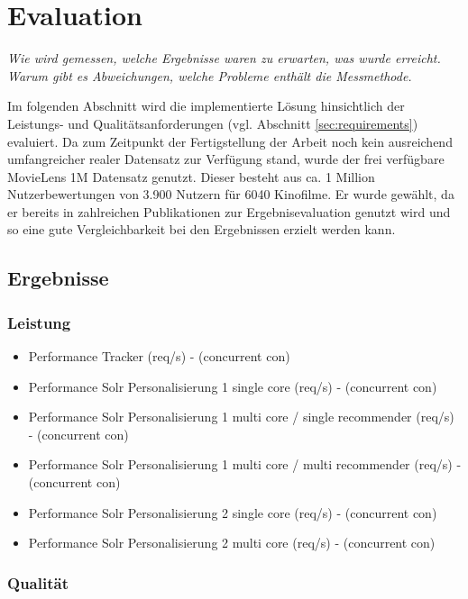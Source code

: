 \section{Evaluation}\label{sec:evaluation}

\textit{Wie wird gemessen, welche Ergebnisse waren zu erwarten, was wurde erreicht. Warum gibt es Abweichungen, welche Probleme enthält die Messmethode.}

Im folgenden Abschnitt wird die implementierte Lösung hinsichtlich der Leistungs- und Qualitätsanforderungen (vgl. Abschnitt \ref{sec:requirements}) evaluiert. Da zum Zeitpunkt der Fertigstellung der Arbeit noch kein ausreichend umfangreicher realer Datensatz zur Verfügung stand, wurde der frei verfügbare MovieLens 1M \citep{movielens1m} Datensatz genutzt. Dieser besteht aus ca. 1 Million Nutzerbewertungen von 3.900 Nutzern für 6040 Kinofilme. Er wurde gewählt, da er bereits in zahlreichen Publikationen zur Ergebnisevaluation genutzt wird und so eine gute Vergleichbarkeit bei den Ergebnissen erzielt werden kann.

\subsection{Ergebnisse}

\subsubsection{Leistung}

\begin{itemize}
\item Performance Tracker (req/s) - (concurrent con)
\item Performance Solr Personalisierung 1 single core (req/s) - (concurrent con)
\item Performance Solr Personalisierung 1 multi core / single recommender (req/s) - (concurrent con)
\item Performance Solr Personalisierung 1 multi core / multi recommender (req/s) - (concurrent con)
\item Performance Solr Personalisierung 2 single core (req/s) - (concurrent con)
\item Performance Solr Personalisierung 2 multi core (req/s) - (concurrent con)
\end{itemize}

\subsubsection{Qualität}

